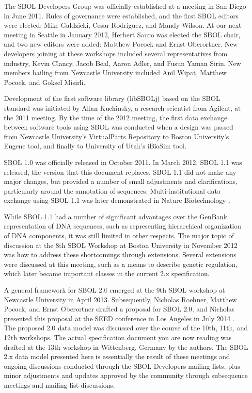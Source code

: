 The SBOL Developers Group was officially established at a meeting in San Diego in June 2011.  Rules of governance were established, and the first SBOL editors were elected: Mike Galdzicki, Cesar Rodriguez, and Mandy Wilson. At our next meeting in Seattle in January 2012, Herbert Sauro was elected the SBOL chair, and two new editors were added: Matthew Pocock and Ernst Oberortner.  New developers joining at these workshops included several representatives from industry, Kevin Clancy, Jacob Beal, Aaron Adler, and Fusun Yaman Sirin. New members hailing from Newcastle University included Anil Wipat, Matthew Pocock, and Goksel Misirli.

Development of the first software library (libSBOLj) based on the SBOL standard was initiated by Allan Kuchinsky, a research scientist from Agilent, at the 2011 meeting.  By the time of the 2012 meeting, the first data exchange between software tools using SBOL was conducted when a design was passed from Newcastle University's VirtualParts Repository to Boston University's Eugene tool, and finally to University of Utah's iBioSim tool. 

SBOL 1.0 was officially released in October 2011.  In March 2012, SBOL 1.1 was released, the version that this document replaces. SBOL 1.1 did not make any major changes, but provided a number of small adjustments and clarifications, particularly around the annotation of sequences.  Multi-institutional data exchange using SBOL 1.1 was later demonstrated in Nature Biotechnology \cite{galdzicki2014synthetic}. 

While SBOL 1.1 had a number of significant advantages over the GenBank representation of DNA sequences, such as representing hierarchical organization of DNA components, it was still limited in other respects. The major topic of discussion at the 8th SBOL Workshop at Boston University in November 2012 was how to address these shortcomings through extensions.  Several extensions were discussed at this meeting, such as a means to describe genetic regulation, which later became important classes in the current 2.x specification.  

A general framework for SBOL 2.0 emerged at the 9th SBOL workshop at Newcastle University in April 2013.  Subsequently, Nicholas Roehner, Matthew Pocock, and Ernst Oberortner drafted a proposal for SBOL 2.0, and Nicholas presented this proposal at the SEED conference in Los Angeles in July 2014 \cite{roehner2014proposed}.  The proposed 2.0 data model was discussed over the course of the 10th, 11th, and 12th workshops.  
The actual specification document you are now reading was drafted at the 13th workshop in Wittenberg, Germany by the authors. The SBOL 2.x data model presented here is essentially the result of these meetings and ongoing discussions conducted through the SBOL Developers mailing lists, plus minor adjustments and updates approved by the community through subsequence meetings and mailing list discussions.

